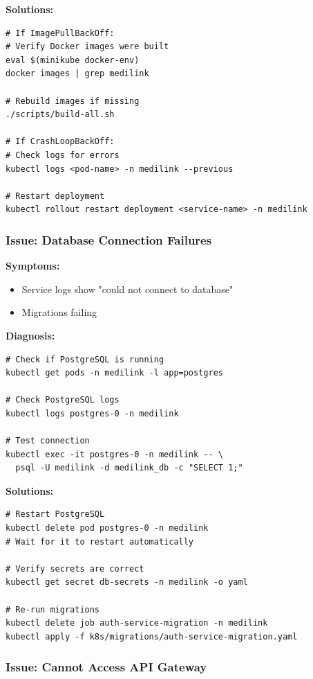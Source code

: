 \documentclass[12pt,a4paper]{article}
\begin{document}
\textbf{Solutions:}
\begin{lstlisting}[style=bash]
# If ImagePullBackOff:
# Verify Docker images were built
eval $(minikube docker-env)
docker images | grep medilink

# Rebuild images if missing
./scripts/build-all.sh

# If CrashLoopBackOff:
# Check logs for errors
kubectl logs <pod-name> -n medilink --previous

# Restart deployment
kubectl rollout restart deployment <service-name> -n medilink
\end{lstlisting}

\subsubsection{Issue: Database Connection Failures}

\textbf{Symptoms:}
\begin{itemize}
    \item Service logs show "could not connect to database"
    \item Migrations failing
\end{itemize}

\textbf{Diagnosis:}
\begin{lstlisting}[style=bash]
# Check if PostgreSQL is running
kubectl get pods -n medilink -l app=postgres

# Check PostgreSQL logs
kubectl logs postgres-0 -n medilink

# Test connection
kubectl exec -it postgres-0 -n medilink -- \
  psql -U medilink -d medilink_db -c "SELECT 1;"
\end{lstlisting}

\textbf{Solutions:}
\begin{lstlisting}[style=bash]
# Restart PostgreSQL
kubectl delete pod postgres-0 -n medilink
# Wait for it to restart automatically

# Verify secrets are correct
kubectl get secret db-secrets -n medilink -o yaml

# Re-run migrations
kubectl delete job auth-service-migration -n medilink
kubectl apply -f k8s/migrations/auth-service-migration.yaml
\end{lstlisting}

\subsubsection{Issue: Cannot Access API Gateway}
\end{document}
